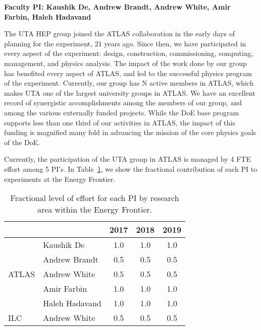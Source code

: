 
\textbf{Faculty PI: Kaushik De, Andrew Brandt, Andrew White, Amir Farbin, Haleh Hadavand}

The UTA HEP group joined the ATLAS collaboration in the early days of planning for the experiment, 21 years ago. Since then, we have participated in every aspect of the experiment: design, construction, commissioning, computing, management, and physics analysis. 
The impact of the work done by our group has benefited every aspect of ATLAS, and led to the successful physics program of the experiment. 
Currently, our group has N active members in ATLAS, which makes UTA one of the largest university groups in ATLAS. We have an excellent record of synergistic accomplishments 
among the members of our group, and among the various externally funded projects. While the DoE base program supports less than one third of our activities in ATLAS, the impact of 
this funding is magnified many fold in advancing the mission of the core physics goals of the DoE.

Currently, the participation of the UTA group in ATLAS is managed by 4 FTE effort among 5 PI's. In Table~\ref{table:atlas-intro}, we show the fractional contribution of each PI to experiments at the Energy Frontier.

\begin{table}[htb]
\centering
\begin{tabular}{ l | l | c | c | c }
\hline \hline
\multicolumn{2}{c|}{} & 2017 & 2018 & 2019 \\ \hline
\multirow{5}{*}{ATLAS} & Kaushik De & 1.0 & 1.0 & 1.0 \\ \cline{2-5}
 & Andrew Brandt & 0.5 & 0.5 & 0.5 \\ \cline{2-5}
 & Andrew White & 0.5 & 0.5 & 0.5 \\ \cline{2-5}
 & Amir Farbin & 1.0 & 1.0 &1.0 \\ \hline
 & Haleh Hadavand & 1.0 & 1.0 & 1.0 \\ \cline{2-5}
ILC & Andrew White & 0.5 & 0.5 & 0.5 \\ \hline  \hline
\end{tabular}
\caption{Fractional level of effort for each PI by research area within the Energy Frontier.}
\label{table:atlas-intro}
\end{table}

